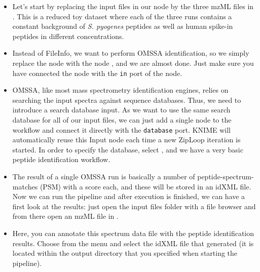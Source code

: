 \begin{itemize}
\item Let's start by replacing the input files in our  node by the three mzML files in . This is a reduced toy dataset where each of the three runs contains a constant background of \textit{S. pyogenes} peptides as well as human spike-in peptides in different concentrations.~\cite{Chawade:2015}
\item Instead of FileInfo, we want to perform OMSSA identification, so we simply replace the  node with the  node , and we are almost done. Just make sure you have connected the  node with the \texttt{in} port of the  node.
\item OMSSA, like most mass spectrometry identification engines, relies on searching the input spectra against sequence databases. Thus, we need to introduce a search database input. As we want to use the same search database for all of our input files, we can just add a single  node to the workflow and connect it directly with the  \texttt{database} port. KNIME will automatically reuse this Input node each time a new ZipLoop iteration is started. In order to specify the database, select , and we have a very basic peptide identification workflow.
\item The result of a single OMSSA run is basically a number of peptide-spectrum-matches (PSM) with a score each, and these will be stored in an idXML file. Now we can run the pipeline and after execution is finished, we can have a first look at the results: just open the input files folder with a file browser and from there open an mzML file in .
\item Here, you can annotate this spectrum data file with the peptide identification results. Choose  from the menu and select the idXML file that  generated (it is located within the output directory that you specified when starting the pipeline).

\end{itemize}
